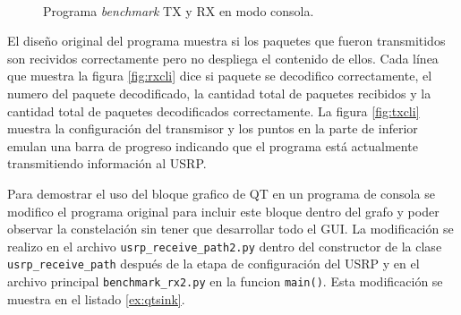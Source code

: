 \begin{figure}[htp]
  \centering
  \\
  \vspace{0.5in}
  \caption{Programa \emph{benchmark} TX y RX en modo consola.}
  \label{fig:benchcli}
\end{figure}

El dise\~no original del programa muestra si los paquetes que fueron transmitidos son recividos
correctamente pero no despliega el contenido de ellos. Cada l\'inea que muestra la figura
\ref{fig:rxcli} dice si paquete se decodifico correctamente, el numero del paquete decodificado, la
cantidad total de paquetes recibidos y la cantidad total de paquetes decodificados correctamente. La
figura \ref{fig:txcli} muestra la configuraci\'on del transmisor y los puntos en la parte de
inferior emulan una barra de progreso indicando que el programa est\'a actualmente transmitiendo
informaci\'on al USRP.

Para demostrar el uso del bloque grafico de QT en un programa de consola se modifico el programa
original para incluir este bloque dentro del grafo y poder observar la constelaci\'on sin tener que
desarrollar todo el GUI. La modificaci\'on se realizo en el archivo \verb|usrp_receive_path2.py|
dentro del constructor de la clase \verb|usrp_receive_path| despu\'es de la etapa de configuraci\'on
del USRP y en el archivo principal \verb|benchmark_rx2.py| en la funcion \verb|main()|. Esta
modificaci\'on se muestra en el listado \ref{ex:qtsink}.

